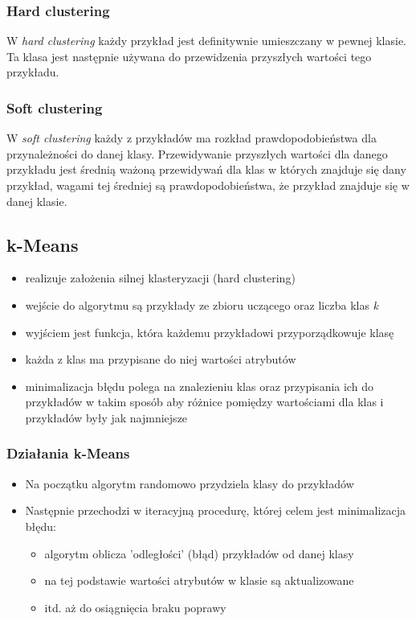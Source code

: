 \documentclass[a4paper,15pt]{article}
\begin{document}
\subsubsection{Hard clustering}
W \textit{hard clustering} każdy przykład jest definitywnie umieszczany w pewnej klasie. Ta klasa jest następnie używana do przewidzenia przyszłych wartości tego przykładu. 

\subsubsection{Soft clustering}
W \textit{soft clustering} każdy z przykładów ma rozkład prawdopodobieństwa dla przynależności do danej klasy. Przewidywanie przyszłych wartości dla danego przykładu jest średnią ważoną przewidywań dla klas w których znajduje się dany przykład, wagami tej średniej są prawdopodobieństwa, że przykład znajduje się w danej klasie.

\subsection{k-Means}
\begin{itemize}
\item realizuje założenia silnej klasteryzacji (hard clustering)
\item wejście do algorytmu są przykłady ze zbioru uczącego oraz liczba klas \textit{k}
\item wyjściem jest funkcja, która każdemu przykładowi przyporządkowuje klasę
\item każda z klas ma przypisane do niej wartości atrybutów
\item minimalizacja błędu polega na znalezieniu klas oraz przypisania ich do przykładów w takim sposób aby różnice pomiędzy wartościami dla klas i przykładów były jak najmniejsze
\end{itemize}

\subsubsection{Działania k-Means}
\begin{itemize}
\item Na początku algorytm randomowo przydziela klasy do przykładów
\item Następnie przechodzi w iteracyjną procedurę, której celem jest minimalizacja błędu:
\begin{itemize}
\item algorytm oblicza 'odległości' (błąd) przykładów od danej klasy
\item na tej podstawie wartości atrybutów w klasie są aktualizowane
\item itd. aż do osiągnięcia braku poprawy 
\end{itemize}
\end{itemize}
\end{document}
